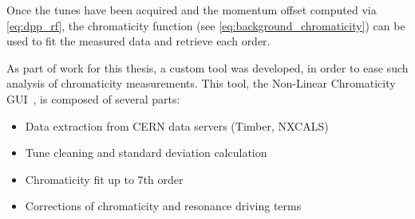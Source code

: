 Once the tunes have been acquired and the momentum offset computed via \cref{eq:dpp_rf}, the
chromaticity function (see \cref{eq:background_chromaticity}) can be used to fit the
measured data and retrieve each order.

As part of work for this thesis, a custom tool was developed, in order to ease such analysis of
chromaticity measurements. This tool, the Non-Linear Chromaticity
GUI~\cite{m_le_garrec_non-linear_2022}, is composed of several parts:

\begin{itemize}
    \tightlist
    \item Data extraction from CERN data servers (Timber, NXCALS)
    \item Tune cleaning and standard deviation calculation
    \item Chromaticity fit up to 7th order
    \item Corrections of chromaticity and resonance driving terms
\end{itemize}

%
%
